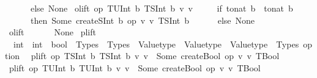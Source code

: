 \begin{isabellebody}
\ \ \ \ \ \ else\ None{\isacharparenright}{\kern0pt}{\isachardoublequoteclose}\isanewline
{\isacharbar}{\kern0pt}\ {\isachardoublequoteopen}olift\ op\ {\isacharparenleft}{\kern0pt}TUInt\ b{}{\isacharparenright}{\kern0pt}\ {\isacharparenleft}{\kern0pt}TSInt\ b{}{\isacharparenright}{\kern0pt}\ v{}\ v{}\ {\isacharequal}{\kern0pt}\isanewline
\ \ \ \ {\isacharparenleft}{\kern0pt}if\ to{\isacharunderscore}{\kern0pt}nat\ b{}\ {\isacharless}{\kern0pt}\ to{\isacharunderscore}{\kern0pt}nat\ b{}\isanewline
\ \ \ \ \ \ then\ Some\ {\isacharparenleft}{\kern0pt}createSInt\ b{}\ {\isacharparenleft}{\kern0pt}op\ {\isasymlceil}v{}{\isasymrceil}\ {\isasymlceil}v{}{\isasymrceil}{\isacharparenright}{\kern0pt}{\isacharcomma}{\kern0pt}\ TSInt\ b{}{\isacharparenright}{\kern0pt}\isanewline
\ \ \ \ \ \ else\ None{\isacharparenright}{\kern0pt}{\isachardoublequoteclose}\isanewline
{\isacharbar}{\kern0pt}\ {\isachardoublequoteopen}olift\ {\isacharunderscore}{\kern0pt}\ {\isacharunderscore}{\kern0pt}\ {\isacharunderscore}{\kern0pt}\ {\isacharunderscore}{\kern0pt}\ {\isacharunderscore}{\kern0pt}\ {\isacharequal}{\kern0pt}\ None{\isachardoublequoteclose}\isanewline
\isanewline
\isanewline
{}\isamarkupfalse%
\ plift\ {\isacharcolon}{\kern0pt}{\isacharcolon}{\kern0pt}\isanewline
\ \ {\isachardoublequoteopen}{\isacharparenleft}{\kern0pt}int\ {\isasymRightarrow}\ int\ {\isasymRightarrow}\ bool{\isacharparenright}{\kern0pt}\ {\isasymRightarrow}\ Types\ {\isasymRightarrow}\ Types\ {\isasymRightarrow}\ Valuetype\ {\isasymRightarrow}\ Valuetype\ {\isasymRightarrow}\ {\isacharparenleft}{\kern0pt}Valuetype\ {\isacharasterisk}{\kern0pt}\ Types{\isacharparenright}{\kern0pt}\ option{\isachardoublequoteclose}\isanewline
{}\isanewline
\ \ {\isachardoublequoteopen}plift\ op\ {\isacharparenleft}{\kern0pt}TSInt\ b{}{\isacharparenright}{\kern0pt}\ {\isacharparenleft}{\kern0pt}TSInt\ b{}{\isacharparenright}{\kern0pt}\ v{}\ v{}\ {\isacharequal}{\kern0pt}\ Some\ {\isacharparenleft}{\kern0pt}createBool\ {\isacharparenleft}{\kern0pt}op\ {\isasymlceil}v{}{\isasymrceil}\ {\isasymlceil}v{}{\isasymrceil}{\isacharparenright}{\kern0pt}{\isacharcomma}{\kern0pt}\ TBool{\isacharparenright}{\kern0pt}{\isachardoublequoteclose}\isanewline
{\isacharbar}{\kern0pt}\ {\isachardoublequoteopen}plift\ op\ {\isacharparenleft}{\kern0pt}TUInt\ b{}{\isacharparenright}{\kern0pt}\ {\isacharparenleft}{\kern0pt}TUInt\ b{}{\isacharparenright}{\kern0pt}\ v{}\ v{}\ {\isacharequal}{\kern0pt}\ Some\ {\isacharparenleft}{\kern0pt}createBool\ {\isacharparenleft}{\kern0pt}op\ {\isasymlceil}v{}{\isasymrceil}\ {\isasymlceil}v{}{\isasymrceil}{\isacharparenright}{\kern0pt}{\isacharcomma}{\kern0pt}\ TBool{\isacharparenright}{\kern0pt}{\isachardoublequoteclose}\isanewline

\end{isabellebody}
